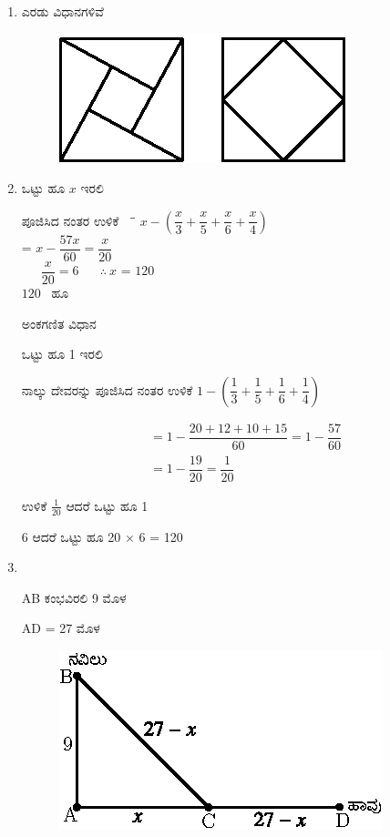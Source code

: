 \begin{enumerate}
\item ಎರಡು ವಿಧಾನಗಳಿವೆ

\begin{figure}[H]
\centering
\includegraphics{images/chap2/ans24.eps}
\end{figure}

\item ಒಟ್ಟು ಹೂ $x$ ಇರಲಿ 
\begin{tabbing}
ಪೂಜಿಸಿದ ನಂತರ ಉಳಿಕೆ ~~\= \quad \=  $x - \left(\dfrac{x}{3} + \dfrac{x}{5} + \dfrac{x}{6} + \dfrac{x}{4}\right)$\\[0.1cm]
\quad \> = \> $x - \dfrac{57x}{60} = \dfrac{x}{20}$\\
~~~\quad $\dfrac{x}{20} = 6$ ~ ~$\therefore~ x$ \> = \> $120$\\
\> \> $120$~ ಹೂ
\end{tabbing}

\smallskip
ಅಂಕಗಣಿತ ವಿಧಾನ 

ಒಟ್ಟು ಹೂ 1 ಇರಲಿ 

ನಾಲ್ಕು ದೇವರನ್ನು ಪೂಜಿಸಿದ ನಂತರ ಉಳಿಕೆ $1 - \left(\dfrac{1}{3} + \dfrac{1}{5} + \dfrac{1}{6} + \dfrac{1}{4}\right)$

\begin{align*}
& = 1 - \dfrac{20 + 12 + 10 + 15}{60} = 1 - \dfrac{57}{60}\\
& = 1 - \dfrac{19}{20} = \dfrac{1}{20}
\end{align*}

ಉಳಿಕೆ $\frac{1}{20}$ ಆದರೆ ಒಟ್ಟು ಹೂ 1

6 ಆದರೆ ಒಟ್ಟು ಹೂ 20 $\times$ 6 = 120

\item 
~
\begin{minipage}[t]{4cm}
AB ಕಂಭವಿರಲಿ 9 ಮೊಳ 

AD = 27 ಮೊಳ 
\end{minipage}
\begin{minipage}[t]{5cm}
\begin{figure}[H]
\centering
\includegraphics{images/chap2/ans26.eps}
\end{figure}
\end{minipage}


\end{enumerate}
